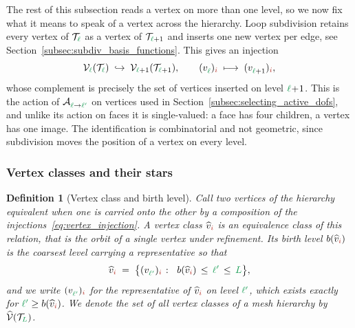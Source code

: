 \documentclass[a4paper, 12pt]{article}
\newcommand{\green}{\color{ForestGreen}}
\newcommand{\brickred}{\color{BrickRed}}
\newcommand{\T}{\mathcal{T}}
\newcommand{\V}{\mathcal{V}}
\newcommand{\vertex}[2]{\freeQ{v}{}{#1}{#2}}
\newcommand{\vertexClass}[1]{\widehat{v}_{#1}}
\newcommand{\vertexClasses}{\widehat{\V}}
\newcommand{\coarseIdxone}{{\brickred i}}
\renewcommand{\l}{{\green\ell}}
\renewcommand{\L}{{\green L}}
\newcommand{\lone}{{\green {\l'}  }}
\newcommand{\freeQ}[4]{ ( {#1}^{#2}_{#3} )_{#4}}
\newcommand{\Aop}[3]{\mathcal{A}^{#1}_{{#2} \to {#3}}}
\newtheorem{definition}[theorem]{Definition}
\theoremstyle{definition}
\theoremstyle{plain}
\numberwithin{equation}{section}
\newcommand{\birthLevel}{b}
\begin{document}
\medskip

The rest of this subsection reads a vertex on more than one level, so we now fix what it means to speak of a vertex across the hierarchy. Loop subdivision retains every vertex of $\T_\l$ as a vertex of $\T_{\l+1}$ and inserts one new vertex per edge, see Section~\ref{subsec:subdiv_basis_functions}. This gives an injection
\begin{equation}
    \label{eq:vertex_injection}
    \V_\l(\T_\l) \; \hookrightarrow \; \V_{\l+1}(\T_{\l+1}) , \qquad \vertex{\l}{\coarseIdxone} \; \longmapsto \; \vertex{\l+1}{\coarseIdxone} ,
\end{equation}
whose complement is precisely the set of vertices inserted on level $\l \! + \! 1$. This is the action of $\Aop{}{\l}{\lone}$ on vertices used in Section~\ref{subsec:selecting_active_dofs}, and unlike its action on faces it is single-valued: a face has four children, a vertex has one image. The identification is combinatorial and not geometric, since subdivision moves the position of a vertex on every level.

\subsubsection{Vertex classes and their stars}
\label{subsubsec:vertex_classes}

\begin{definition}[Vertex class and birth level]
    \label{def:vertex_class}
    Call two vertices of the hierarchy \emph{equivalent} when one is carried onto the other by a composition of the injections~\eqref{eq:vertex_injection}. A \emph{vertex class} $\vertexClass{\coarseIdxone}$ is an equivalence class of this relation, that is the orbit of a single vertex under refinement. Its \emph{birth level} $\birthLevel(\vertexClass{\coarseIdxone})$ is the coarsest level carrying a representative so that
    \begin{equation}
        \label{eq:vertex_class}
        \vertexClass{\coarseIdxone} \; = \; \big\{ \vertex{\lone}{\coarseIdxone} \; \colon \;\; \birthLevel(\vertexClass{\coarseIdxone}) \, \leq \, \lone \, \leq \, \L \big\} ,
    \end{equation}
    and we write $\vertex{\lone}{\coarseIdxone}$ for the representative of $\vertexClass{\coarseIdxone}$ on level $\lone$, which exists exactly for $\lone \geq \birthLevel(\vertexClass{\coarseIdxone})$. We denote the set of all vertex classes of a mesh hierarchy by $\vertexClasses(\T_\L)$.
\end{definition}
\end{document}

